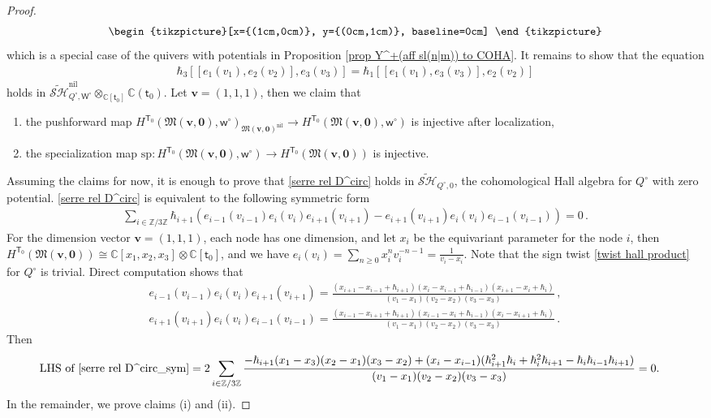 \documentclass[10pt]{amsart}
\theoremstyle{definition}
\numberwithin{equation}{section}
\newcommand{\bC}{\mathbb{C}}
\newcommand{\bZ}{\mathbb{Z}}
\newcommand{\bv}{\mathbf{v}}
\newcommand{\fM}{\mathfrak{M}}
\newcommand{\sT}{\mathsf{T}}
\newcommand{\sW}{\mathsf{W}}
\newcommand{\sw}{\mathsf{w}}
\begin{document}
\begin{proof}
\begin{equation*}
\begin{tikzpicture}[x={(1cm,0cm)}, y={(0cm,1cm)}, baseline=0cm]
 
\end{tikzpicture}
\end{equation*}
which is a special case of the quivers with potentials in Proposition \ref{prop Y^+(aff sl(n|m)) to COHA}. It remains to show that the equation
\begin{align}\label{serre rel D^circ}
\hbar_3[[e_1(v_1),e_2(v_2)],e_3(v_3)]=\hbar_1[[e_1(v_1),e_3(v_3)],e_2(v_2)]
\end{align}
holds in $\widetilde{\mathcal{SH}}^{\mathrm{nil}}_{Q^\circ,\sW^\circ}\otimes_{\bC[\mathsf t_0]}\bC(\mathsf t_0)$. Let $\bv=(1,1,1)$, then we claim that
\begin{enumerate}
    \item[(i)] the pushforward map $H^{\sT_0}(\fM(\bv,\mathbf 0),\sw^\circ)_{\fM(\bv,\mathbf 0)^{\mathrm{nil}}}\to H^{\sT_0}(\fM(\bv,\mathbf 0),\sw^\circ)$ is injective after localization,
    \item[(ii)] the specialization map $\mathrm{sp}\colon H^{\sT_0}(\fM(\bv,\mathbf 0),\sw^\circ)\to H^{\sT_0}(\fM(\bv,\mathbf 0))$ is injective.
\end{enumerate}
Assuming the claims for now, it is enough to prove that \eqref{serre rel D^circ} holds in $\widetilde{\mathcal{SH}}_{Q^\circ,0}$, the cohomological Hall algebra for $Q^\circ$ with zero potential. \eqref{serre rel D^circ} is equivalent to the following symmetric form
\begin{align}\label{serre rel D^circ_sym}
\sum_{i\in \bZ/3\bZ}\hbar_{i+1}\left(e_{i-1}(v_{i-1})e_{i}(v_{i})e_{i+1}(v_{i+1})-e_{i+1}(v_{i+1})e_{i}(v_{i})e_{i-1}(v_{i-1})\right)=0\,.
\end{align}
For the dimension vector $\bv=(1,1,1)$, each node has one dimension, and let $x_i$ be the equivariant parameter for the node $i$, then $H^{\sT_0}(\fM(\bv,\mathbf 0))\cong \bC[x_1,x_2,x_3]\otimes \bC[\mathsf t_0]$, and we have $e_i(v_i)=\sum_{n\geqslant 0}x_i^n v_i^{-n-1}=\frac{1}{v_i-x_i}$. Note that the sign twist \eqref{twist hall product} for $Q^\circ$ is trivial. Direct computation shows that
\begin{gather*}
e_{i-1}(v_{i-1})e_{i}(v_{i})e_{i+1}(v_{i+1})=\frac{(x_{i+1}-x_{i-1}+\hbar_{i+1})(x_{i}-x_{i-1}+\hbar_{i-1})(x_{i+1}-x_i+\hbar_i)}{(v_{1}-x_{1})(v_{2}-x_{2})(v_{3}-x_{3})}\,,\\
e_{i+1}(v_{i+1})e_{i}(v_{i})e_{i-1}(v_{i-1})=\frac{(x_{i-1}-x_{i+1}+\hbar_{i+1})(x_{i-1}-x_{i}+\hbar_{i-1})(x_i-x_{i+1}+\hbar_i)}{(v_{1}-x_{1})(v_{2}-x_{2})(v_{3}-x_{3})}\,.
\end{gather*}
Then
\begin{align*}
\text{LHS of \eqref{serre rel D^circ_sym}}&=2\sum_{i\in \bZ/3\bZ}\frac{-\hbar_{i+1}(x_1-x_3)(x_2-x_1)(x_3-x_2)+(x_i-x_{i-1})(\hbar_{i+1}^2\hbar_i+\hbar_{i}^2\hbar_{i+1}-\hbar_i\hbar_{i-1}\hbar_{i+1})}{(v_{1}-x_{1})(v_{2}-x_{2})(v_{3}-x_{3})}=0.
\end{align*}
In the remainder, we prove claims (i) and (ii).


\end{proof}
\end{document}
